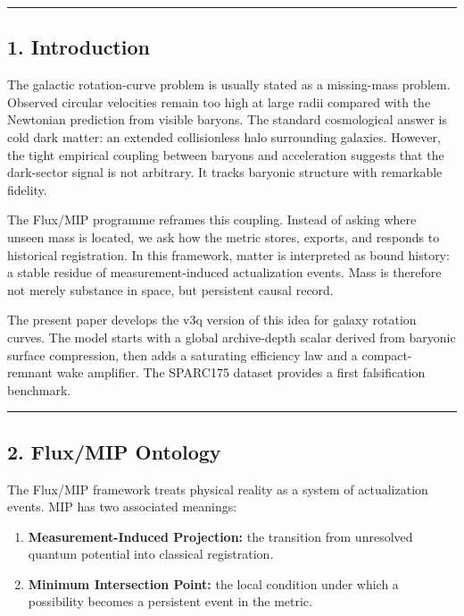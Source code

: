 \documentclass[
]{article}
\providecommand{\tightlist}{%
  \setlength{\itemsep}{0pt}\setlength{\parskip}{0pt}}
\begin{document}
\begin{center}\rule{0.5\linewidth}{0.5pt}\end{center}

\subsection{1. Introduction}\label{introduction}

The galactic rotation-curve problem is usually stated as a missing-mass
problem. Observed circular velocities remain too high at large radii
compared with the Newtonian prediction from visible baryons. The
standard cosmological answer is cold dark matter: an extended
collisionless halo surrounding galaxies. However, the tight empirical
coupling between baryons and acceleration suggests that the dark-sector
signal is not arbitrary. It tracks baryonic structure with remarkable
fidelity.

The Flux/MIP programme reframes this coupling. Instead of asking where
unseen mass is located, we ask how the metric stores, exports, and
responds to historical registration. In this framework, matter is
interpreted as bound history: a stable residue of measurement-induced
actualization events. Mass is therefore not merely substance in space,
but persistent causal record.

The present paper develops the v3q version of this idea for galaxy
rotation curves. The model starts with a global archive-depth scalar
derived from baryonic surface compression, then adds a saturating
efficiency law and a compact-remnant wake amplifier. The SPARC175
dataset provides a first falsification benchmark.

\begin{center}\rule{0.5\linewidth}{0.5pt}\end{center}

\subsection{2. Flux/MIP Ontology}\label{fluxmip-ontology}

The Flux/MIP framework treats physical reality as a system of
actualization events. MIP has two associated meanings:

\begin{enumerate}
\def\labelenumi{\arabic{enumi}.}
\tightlist
\item
  \textbf{Measurement-Induced Projection:} the transition from
  unresolved quantum potential into classical registration.
\item
  \textbf{Minimum Intersection Point:} the local condition under which a
  possibility becomes a persistent event in the metric.
\end{enumerate}
\end{document}

